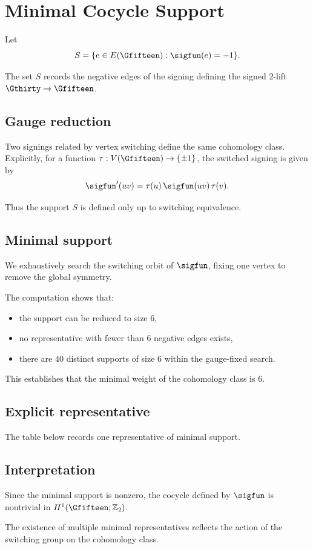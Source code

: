 \section{Minimal Cocycle Support}

Let
\[
S = \{ e \in E(\Gfifteen) : \sigfun(e) = -1 \}.
\]

The set $S$ records the negative edges of the signing defining the
signed $2$-lift $\Gthirty \to \Gfifteen$.

\subsection{Gauge reduction}

Two signings related by vertex switching define the same cohomology
class. Explicitly, for a function $\tau : V(\Gfifteen) \to \{\pm 1\}$,
the switched signing is given by
\[
\sigfun'(uv) = \tau(u)\,\sigfun(uv)\,\tau(v).
\]

Thus the support $S$ is defined only up to switching equivalence.

\subsection{Minimal support}

We exhaustively search the switching orbit of $\sigfun$, fixing one
vertex to remove the global symmetry.

The computation shows that:
\begin{itemize}
\item the support can be reduced to size $6$,
\item no representative with fewer than $6$ negative edges exists,
\item there are $40$ distinct supports of size $6$ within the
gauge-fixed search.
\end{itemize}

This establishes that the minimal weight of the cohomology class is $6$.

\subsection{Explicit representative}

The table below records one representative of minimal support.



\subsection{Interpretation}

Since the minimal support is nonzero, the cocycle defined by $\sigfun$
is nontrivial in $H^1(\Gfifteen; \mathbb{Z}_2)$.

The existence of multiple minimal representatives reflects the action
of the switching group on the cohomology class.

